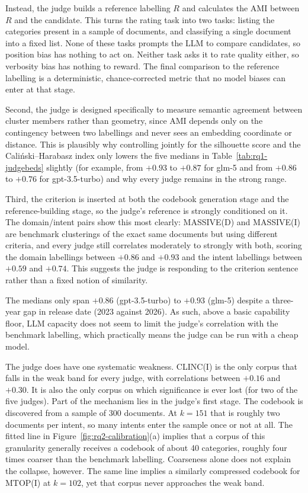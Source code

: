\documentclass[11pt,a4paper,oneside]{report}
\begin{document}
Instead, the judge builds a reference labelling $R$ and calculates the
AMI between $R$ and the candidate. This turns the rating task into two
tasks: listing the categories present in a sample of documents, and
classifying a single document into a fixed list. None of these tasks
prompts the LLM to compare candidates, so position bias has nothing to
act on. Neither task asks it to rate quality either, so verbosity
bias has nothing to reward. The final comparison to the reference
labelling is a deterministic, chance-corrected metric that no model
biases can enter at that stage.

Second, the judge is designed specifically to measure semantic agreement
between cluster members rather than geometry, since AMI depends only on
the contingency between two labellings and never sees an embedding
coordinate or distance. This is plausibly why controlling jointly for the silhouette score and the Cali\'nski--Harabasz index only lowers the five medians in Table~\ref{tab:rq1-judgebeds} slightly (for example, from
$+0.93$ to $+0.87$ for {\small\ttfamily glm-5} and from $+0.86$ to $+0.76$ for {\small\ttfamily gpt-3.5-turbo}) and why every judge remains in the strong range.

Third, the criterion is inserted at both the codebook generation stage
and the reference-building stage, so the judge's reference is strongly
conditioned on it. The domain/intent pairs show this most clearly:
MASSIVE(D) and MASSIVE(I) are benchmark clusterings of the exact same
documents but using different criteria, and every judge still correlates
moderately to strongly with both, scoring the domain labellings between
$+0.86$ and $+0.93$ and the intent labellings between $+0.59$ and
$+0.74$. This suggests the judge is responding to the criterion sentence
rather than a fixed notion of similarity.

The medians only span $+0.86$ ({\small\ttfamily gpt-3.5-turbo}) to $+0.93$
({\small\ttfamily glm-5}) despite a three-year gap in release date (2023 against 2026). As such,
above a basic capability floor, LLM capacity does not seem to limit the
judge's correlation with the benchmark labelling, which practically means the
judge can be run with a cheap model.

The judge does have one systematic weakness. CLINC(I) is the only corpus
that falls in the weak band for every judge, with correlations between
$+0.16$ and $+0.30$. It is also the only corpus on which significance is
ever lost (for two of the five judges). Part of the mechanism lies in the
judge's first stage. The codebook is discovered from a sample of 300
documents. At $k = 151$ that is roughly two documents per intent, so many
intents enter the sample once or not at all. The fitted line in
Figure~\ref{fig:rq2-calibration}(a) implies that a corpus of this
granularity generally receives a codebook of about 40 categories, roughly
four times coarser than the benchmark labelling. Coarseness alone does
not explain the collapse, however. The same line implies a similarly
compressed codebook for MTOP(I) at $k = 102$, yet that corpus never
approaches the weak band.
\end{document}
